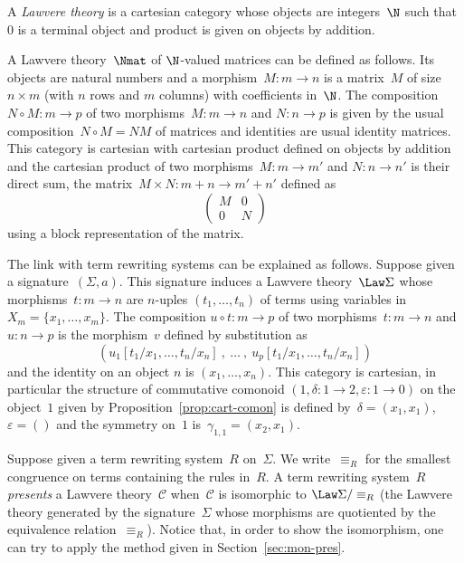 \documentclass{LMCS}
\renewcommand{\C}{\mathcal{C}}
\begin{document}
\begin{defi}
  A \emph{Lawvere theory} is a cartesian category whose objects are
  integers~$\N$ such that~$0$ is a terminal object and product is given on
  objects by addition.
\end{defi}

\begin{exa}
  \label{ex:Nmat}
  A Lawvere theory~$\Nmat$ of $\N$-valued matrices can be defined as
  follows. Its objects are natural numbers and a morphism~$M:m\to n$ is a
  matrix~$M$ of size $n\times m$ (with $n$ rows and $m$ columns) with coefficients in~$\N$. The composition
  $N\circ M:m\to p$ of two morphisms~$M:m\to n$ and \hbox{$N:n\to p$} is given
  by the usual composition~$N\circ M=NM$ of matrices and identities are usual
  identity matrices. This category is cartesian with cartesian product defined
  on objects by addition and the cartesian product of two morphisms~$M:m\to m'$
  and \hbox{$N:n\to n'$} is their direct sum, \ie the matrix~$M\times N:m+n\to
  m'+n'$ defined as
  \[
  \left(
    \begin{matrix}
      M&0\\
      0&N
    \end{matrix}
  \right)
  \]
  using a block representation of the matrix.
\end{exa}

The link with term rewriting systems can be explained as follows. Suppose given
a signature~$(\Sigma,a)$. This signature induces a Lawvere theory~$\Law\Sigma$
whose morphisms~$t:m\to n$ are $n$-uples $(t_1,\ldots,t_n)$ of terms using
variables in~$X_m=\{x_1,\ldots,x_m\}$. The composition \hbox{$u\circ t:m\to p$}
of two morphisms~$t:m\to n$ and~$u:n\to p$ is the morphism~$v$ defined by
substitution as
\[
(u_1[t_1/x_1,\ldots,t_n/x_n]\ ,\ \ldots\ ,\ u_p[t_1/x_1,\ldots,t_n/x_n])
\]
and the identity on an object $n$ is $(x_1,\ldots,x_n)$. This category is
cartesian, in particular the structure of commutative comonoid $(1,\delta:1\to
2,\varepsilon:1\to 0)$ on the object~$1$ given by
Proposition~\ref{prop:cart-comon} is defined by~$\delta=(x_1,x_1)$,
$\varepsilon=()$ and the symmetry on~$1$ is~$\gamma_{1,1}=(x_2,x_1)$.

Suppose given a term rewriting system~$R$ on~$\Sigma$. We write~$\equiv_R$ for
the smallest congruence on terms containing the rules in~$R$. A term rewriting
system~$R$ \emph{presents} a Lawvere theory~$\C$ when~$\C$ is isomorphic to
$\Law\Sigma/\equiv_R$ (the Lawvere theory generated by the signature~$\Sigma$
whose morphisms are quotiented by the equivalence relation~$\equiv_R$).  Notice
that, in order to show the isomorphism, one can try to apply the method given in
Section~\ref{sec:mon-pres}.
\end{document}
